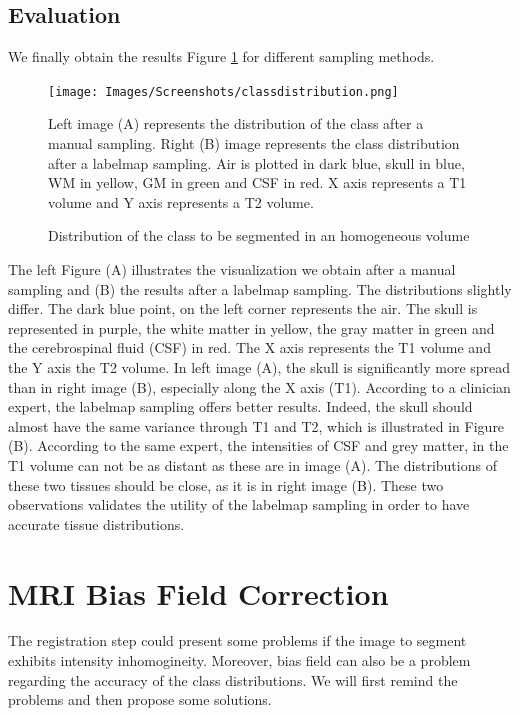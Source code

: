 \subsection{Evaluation}
\par 
We finally obtain the results Figure \ref{fig:intensitynormalization} for different sampling methods.
\begin{figure}\centering\label{classdistribution}
  \texttt{[image: Images/Screenshots/classdistribution.png]}
  \caption{Distribution of the class to be segmented in an homogeneous volume}{Left image (A) represents the distribution of the class after a manual sampling. Right (B) image represents the class distribution after a labelmap sampling. Air is plotted in dark blue, skull in blue, WM in yellow, GM in green and CSF in red. X axis represents a T1 volume and Y axis represents a T2 volume.}\label{fig:intensitynormalization}
 \end{figure}
The left Figure (A) illustrates the visualization we obtain after a manual sampling and (B) the results after a labelmap sampling. The distributions slightly differ. The dark blue point, on the left corner represents the air. The skull is represented in purple, the white matter in yellow, the gray matter in green and the cerebrospinal fluid (CSF) in red. The X axis represents the T1 volume and the Y axis the T2 volume. In left image (A), the skull is significantly more spread than in right image (B), especially along the X axis (T1). According to a clinician expert, the labelmap sampling offers better results. Indeed, the skull should almost have the same variance through T1 and T2, which is illustrated in Figure (B). According to the same expert, the intensities of CSF and grey matter, in the T1 volume can not be as distant as these are in image (A). The distributions of these two tissues should be close, as it is in right image (B). These two observations validates the utility of the labelmap sampling in order to have accurate tissue distributions.


\section{MRI Bias Field Correction}\label{biasfieldcorrectionregistration}

The registration step could present some problems if the image to segment exhibits intensity inhomogineity. Moreover, bias field can also be a problem regarding the accuracy of the class distributions. We will first remind the problems and then propose some solutions.


